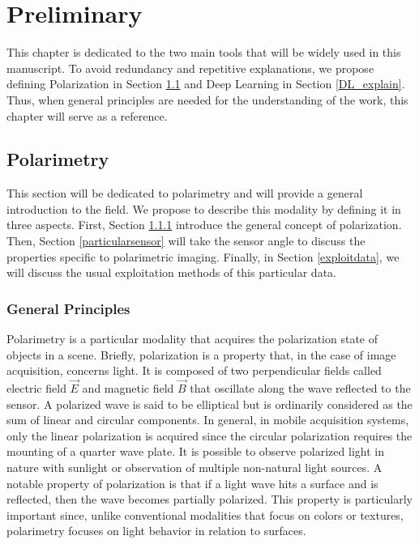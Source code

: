 
\chapter{Preliminary} %

\label{Chapter3} %


This chapter is dedicated to the two main tools that will be widely used in this manuscript. To avoid redundancy and repetitive explanations, we propose defining Polarization in Section \ref{Polar_explain} and Deep Learning in Section \ref{DL_explain}. Thus, when general principles are needed for the understanding of the work, this chapter will serve as a reference.




\section{Polarimetry}\label{Polar_explain}

This section will be dedicated to polarimetry and will provide a general introduction to the field. We propose to describe this modality by defining it in three aspects. First, Section \ref{gdpola} introduce the general concept of polarization. Then, Section \ref{particularsensor} will take the sensor angle to discuss the properties specific to polarimetric imaging. Finally, in Section \ref{exploitdata}, we will discuss the usual exploitation methods of this particular data.


\subsection{General Principles}\label{gdpola}

Polarimetry \cite{collett2005field} is a particular modality that acquires the polarization state of objects in a scene. Briefly, polarization is a property that, in the case of image acquisition, concerns light. It is composed of two perpendicular fields called electric field $\vec{E}$ and magnetic field $\vec{B}$ that oscillate along the wave reflected to the sensor. A polarized wave is said to be elliptical but is ordinarily considered as the sum of linear and circular components.
In general, in mobile acquisition systems, only the linear polarization is acquired since the circular polarization requires the mounting of a quarter wave plate.
It is possible to observe polarized light in nature with sunlight or observation of multiple non-natural light sources. A notable property of polarization is that if a light wave hits a surface and is reflected, then the wave becomes partially polarized. This property is particularly important since, unlike conventional modalities that focus on colors or textures, polarimetry focuses on light behavior in relation to surfaces.

